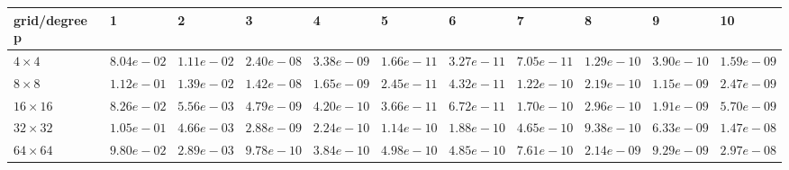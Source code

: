 \begin{tabular}{lllllllllll}
\hline
 grid/degree p   & 1          & 2          & 3          & 4          & 5          & 6          & 7          & 8          & 9          & 10         \\
\hline
 $4 \times 4$    & $8.04e-02$ & $1.11e-02$ & $2.40e-08$ & $3.38e-09$ & $1.66e-11$ & $3.27e-11$ & $7.05e-11$ & $1.29e-10$ & $3.90e-10$ & $1.59e-09$ \\
 $8 \times 8$    & $1.12e-01$ & $1.39e-02$ & $1.42e-08$ & $1.65e-09$ & $2.45e-11$ & $4.32e-11$ & $1.22e-10$ & $2.19e-10$ & $1.15e-09$ & $2.47e-09$ \\
 $16 \times 16$  & $8.26e-02$ & $5.56e-03$ & $4.79e-09$ & $4.20e-10$ & $3.66e-11$ & $6.72e-11$ & $1.70e-10$ & $2.96e-10$ & $1.91e-09$ & $5.70e-09$ \\
 $32 \times 32$  & $1.05e-01$ & $4.66e-03$ & $2.88e-09$ & $2.24e-10$ & $1.14e-10$ & $1.88e-10$ & $4.65e-10$ & $9.38e-10$ & $6.33e-09$ & $1.47e-08$ \\
 $64 \times 64$  & $9.80e-02$ & $2.89e-03$ & $9.78e-10$ & $3.84e-10$ & $4.98e-10$ & $4.85e-10$ & $7.61e-10$ & $2.14e-09$ & $9.29e-09$ & $2.97e-08$ \\
\hline
\end{tabular}